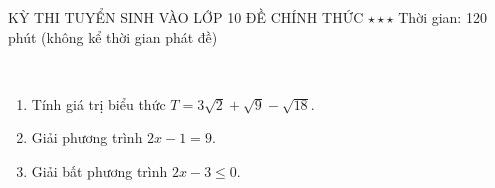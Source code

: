 \tatsode
\begin{name}
    {KỲ THI TUYỂN SINH VÀO LỚP 10}
    {ĐỀ CHÍNH THỨC}
    {$\star\star\star$}
    {Thời gian: 120 phút (không kể thời gian phát đề)}
\end{name}

\begin{bt}[1,5 điểm]~
    \begin{enumerate}[1.]
        \item Tính giá trị biểu thức $T=3\sqrt{2}+\sqrt{9}-\sqrt{18}$.
        \item Giải phương trình $2x-1=9$.
        \item Giải bất phương trình $2x-3\le 0$.
    \end{enumerate}
\end{bt}


